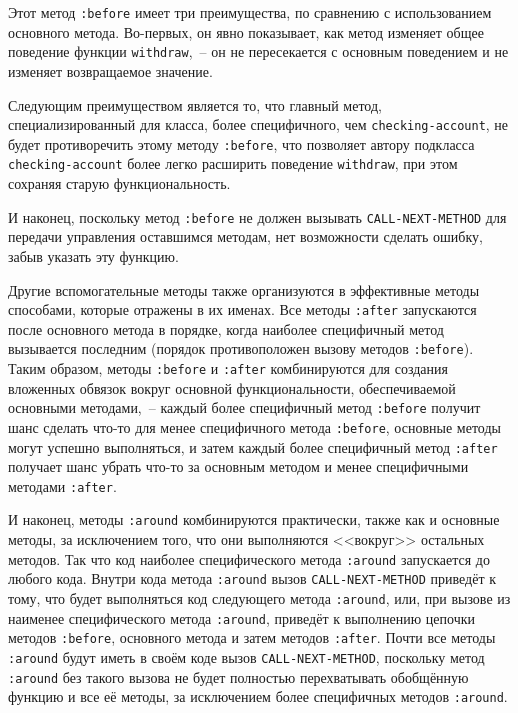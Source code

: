 Этот метод \lstinline{:before} имеет три преимущества, по сравнению с использованием основного
метода.  Во-первых, он явно показывает, как метод изменяет общее поведение функции
\lstinline{withdraw},~-- он не пересекается с основным поведением и не изменяет возвращаемое
значение.

Следующим преимуществом является то, что главный метод, специализированный для класса,
более специфичного, чем \lstinline{checking-account}, не будет противоречить этому методу
\lstinline{:before}, что позволяет автору подкласса \lstinline{checking-account} более легко
расширить поведение \lstinline{withdraw}, при этом сохраняя старую функциональность.

И наконец, поскольку метод \lstinline{:before} не должен вызывать \lstinline{CALL-NEXT-METHOD} для
передачи управления оставшимся методам, нет возможности сделать ошибку, забыв указать эту
функцию.

Другие вспомогательные методы также организуются в эффективные методы способами, которые
отражены в их именах.  Все методы \lstinline{:after} запускаются после основного метода в
порядке, когда наиболее специфичный метод вызывается последним (порядок противоположен
вызову методов \lstinline{:before}).  Таким образом, методы \lstinline{:before} и \lstinline{:after}
комбинируются для создания вложенных обвязок вокруг основной функциональности,
обеспечиваемой основными методами,~-- каждый более специфичный метод \lstinline{:before} получит
шанс сделать что-то для менее специфичного метода \lstinline{:before}, основные методы могут
успешно выполняться, и затем каждый более специфичный метод \lstinline{:after} получает шанс
убрать что-то за основным методом и менее специфичными методами \lstinline{:after}.

И наконец, методы \lstinline{:around} комбинируются практически, также как и основные
методы, за исключением того, что они выполняются <<вокруг>> остальных методов. Так что код
наиболее специфического метода \lstinline{:around} запускается до любого кода. Внутри кода
метода \lstinline{:around} вызов \lstinline{CALL-NEXT-METHOD} приведёт к тому, что будет
выполняться код сле\-дую\-ще\-го метода \lstinline{:around}, или, при вызове из наименее
специфического метода \lstinline{:around}, приведёт к выполнению цепочки методов
\lstinline{:before}, основного метода и затем методов \lstinline{:after}.  Почти все
методы \lstinline{:around} будут иметь в своём коде вызов \lstinline{CALL-NEXT-METHOD},
поскольку метод \lstinline{:around} без такого вызова не будет полностью перехватывать
обобщённую функцию и все её методы, за исключением более специфичных методов
\lstinline{:around}.

